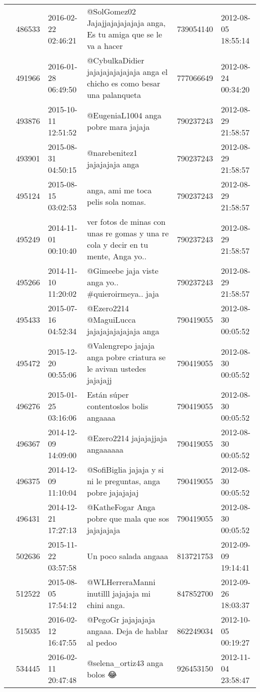 \begin{tabular}{llllrl}
 & 486533& 2016-02-22 02:46:21 & @SolGomez02 Jajajjajajajajaja anga, Es tu amiga que se le va a hacer & 739054140 & 2012-08-05 18:55:14 \\
 & 491966& 2016-01-28 06:49:50 &@CybulkaDidier jajajajajajajaja anga el chicho es como besar una palanqueta & 777066649 & 2012-08-24 00:34:20 \\
 & 493876& 2015-10-11 12:51:52 & @EugeniaL1004 anga pobre mara jajaja & 790237243 & 2012-08-29 21:58:57 \\
 & 493901& 2015-08-31 04:50:15 &@narebenitez1 jajajajaja anga & 790237243 & 2012-08-29 21:58:57 \\
 & 495124& 2015-08-15 03:02:53 &anga, ami me toca pelis sola nomas. & 790237243 & 2012-08-29 21:58:57 \\
 & 495249& 2014-11-01 00:10:40 &ver fotos de minas con unas re gomas y una re cola y decir en tu mente, Anga yo.. & 790237243 & 2012-08-29 21:58:57 \\
 & 495266& 2014-11-10 11:20:02 & @Gimeebe jaja viste anga yo.. \#quieroirmeya.. jaja & 790237243 & 2012-08-29 21:58:57 \\
 & 495433& 2015-07-16 04:52:34 & @Ezero2214 @MaguiLucca jajajajajajajaja anga & 790419055 & 2012-08-30 00:05:52 \\
 & 495472& 2015-12-20 00:55:06 & @Valengrepo jajaja anga pobre criatura se le avivan ustedes jajajajj & 790419055 & 2012-08-30 00:05:52 \\
 & 496276& 2015-01-25 03:16:06 & Están súper contentoslos bolis angaaaa & 790419055 & 2012-08-30 00:05:52 \\
 & 496367& 2014-12-09 14:09:00 & @Ezero2214 jajajajjaja angaaaaaa & 790419055 & 2012-08-30 00:05:52 \\
 & 496375& 2014-12-09 11:10:04 &@SofiBiglia jajaja y si ni le preguntas, anga pobre jajajajaj & 790419055 & 2012-08-30 00:05:52 \\
 & 496431& 2014-12-21 17:27:13 & @KatheFogar Anga pobre que mala que sos jajajajaja & 790419055 & 2012-08-30 00:05:52 \\
 & 502636& 2015-11-22 03:57:58 &Un poco salada angaaa & 813721753 & 2012-09-09 19:14:41 \\
 & 512522& 2015-08-05 17:54:12 & @WLHerreraManni inutilll jajajaja mi chini anga. & 847852700 & 2012-09-26 18:03:37 \\
 & 515035& 2016-02-12 16:47:55 & @PegoGr jajajajaja angaaa. Deja de hablar al pedoo & 862249034 & 2012-10-05 00:19:27 \\
 & 534445& 2016-02-11 20:47:48 & @selena\_ortiz43 anga bolos 😂 & 926453150 & 2012-11-04 23:58:47 \\

\end{tabular}
